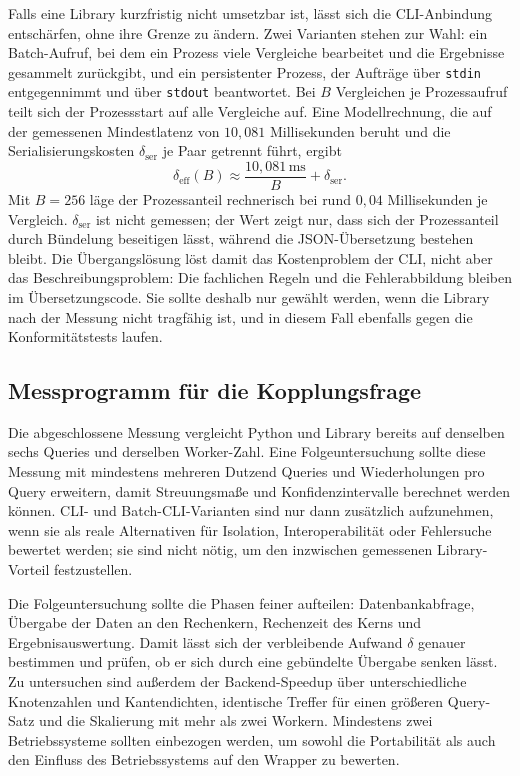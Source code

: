 \documentclass[a4paper,12pt, twoside]{report}
\theoremstyle{definition}
\begin{document}
Falls eine Library kurzfristig nicht umsetzbar ist, lässt sich die CLI-Anbindung entschärfen, ohne ihre Grenze zu ändern. Zwei Varianten stehen zur Wahl: ein Batch-Aufruf, bei dem ein Prozess viele Vergleiche bearbeitet und die Ergebnisse gesammelt zurückgibt, und ein persistenter Prozess, der Aufträge über \texttt{stdin} entgegennimmt und über \texttt{stdout} beantwortet. Bei $B$ Vergleichen je Prozessaufruf teilt sich der Prozessstart auf alle Vergleiche auf. Eine Modellrechnung, die auf der gemessenen Mindestlatenz von $10{,}081$ Millisekunden beruht und die Serialisierungskosten $\delta_{\mathrm{ser}}$ je Paar getrennt führt, ergibt
\[
	\delta_{\mathrm{eff}}(B) \approx \frac{10{,}081\,\mathrm{ms}}{B} + \delta_{\mathrm{ser}}.
\]
Mit $B=256$ läge der Prozessanteil rechnerisch bei rund $0{,}04$ Millisekunden je Vergleich. $\delta_{\mathrm{ser}}$ ist nicht gemessen; der Wert zeigt nur, dass sich der Prozessanteil durch Bündelung beseitigen lässt, während die JSON-Übersetzung bestehen bleibt. Die Übergangslösung löst damit das Kostenproblem der CLI, nicht aber das Beschreibungsproblem: Die fachlichen Regeln und die Fehlerabbildung bleiben im Übersetzungscode. Sie sollte deshalb nur gewählt werden, wenn die Library nach der Messung nicht tragfähig ist, und in diesem Fall ebenfalls gegen die Konformitätstests laufen.

\subsection{Messprogramm für die Kopplungsfrage}
\label{sec:kopplung_messung}

Die abgeschlossene Messung vergleicht Python und Library bereits auf denselben sechs Queries und derselben Worker-Zahl. Eine Folgeuntersuchung sollte diese Messung mit mindestens mehreren Dutzend Queries und Wiederholungen pro Query erweitern, damit Streuungsmaße und Konfidenzintervalle berechnet werden können. CLI- und Batch-CLI-Varianten sind nur dann zusätzlich aufzunehmen, wenn sie als reale Alternativen für Isolation, Interoperabilität oder Fehlersuche bewertet werden; sie sind nicht nötig, um den inzwischen gemessenen Library-Vorteil festzustellen.

Die Folgeuntersuchung sollte die Phasen feiner aufteilen: Datenbankabfrage, Übergabe der Daten an den Rechenkern, Rechenzeit des Kerns und Ergebnisauswertung. Damit lässt sich der verbleibende Aufwand $\delta$ genauer bestimmen und prüfen, ob er sich durch eine gebündelte Übergabe senken lässt. Zu untersuchen sind außerdem der Backend-Speedup über unterschiedliche Knotenzahlen und Kantendichten, identische Treffer für einen größeren Query-Satz und die Skalierung mit mehr als zwei Workern. Mindestens zwei Betriebssysteme sollten einbezogen werden, um sowohl die Portabilität als auch den Einfluss des Betriebssystems auf den Wrapper zu bewerten.
\end{document}
